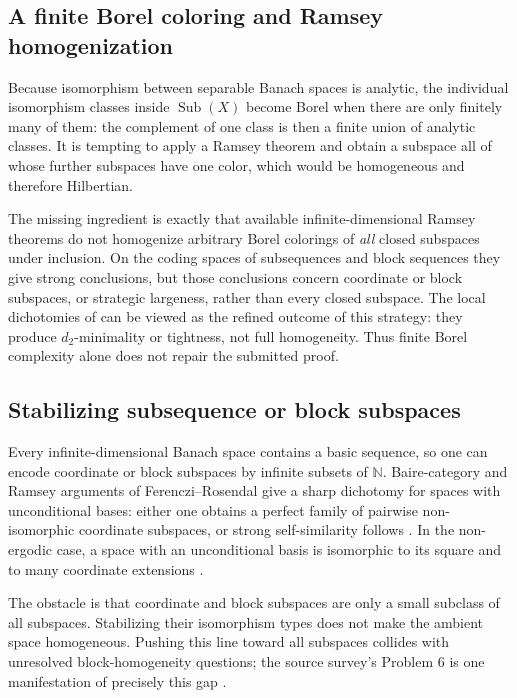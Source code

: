 \documentclass[11pt]{article}
\theoremstyle{definition}
\theoremstyle{remark}
\newcommand{\Sub}{\operatorname{Sub}}
\newcommand{\N}{\mathbb N}
\begin{document}
\subsection{A finite Borel coloring and Ramsey homogenization}

Because isomorphism between separable Banach spaces is analytic, the individual isomorphism classes inside \(\Sub(X)\) become Borel when there are only finitely many of them: the complement of one class is then a finite union of analytic classes.  It is tempting to apply a Ramsey theorem and obtain a subspace all of whose further subspaces have one color, which would be homogeneous and therefore Hilbertian.

The missing ingredient is exactly that available infinite-dimensional Ramsey theorems do not homogenize arbitrary Borel colorings of \emph{all} closed subspaces under inclusion.  On the coding spaces of subsequences and block sequences they give strong conclusions, but those conclusions concern coordinate or block subspaces, or strategic largeness, rather than every closed subspace.  The local dichotomies of \cite{CCRF2023} can be viewed as the refined outcome of this strategy: they produce \(d_2\)-minimality or tightness, not full homogeneity.  Thus finite Borel complexity alone does not repair the submitted proof.

\subsection{Stabilizing subsequence or block subspaces}

Every infinite-dimensional Banach space contains a basic sequence, so one can encode coordinate or block subspaces by infinite subsets of \(\N\).  Baire-category and Ramsey arguments of Ferenczi--Rosendal give a sharp dichotomy for spaces with unconditional bases: either one obtains a perfect family of pairwise non-isomorphic coordinate subspaces, or strong self-similarity follows \cite{FRnumber}.  In the non-ergodic case, a space with an unconditional basis is isomorphic to its square and to many coordinate extensions \cite{FRnumber,CCRF2023}.

The obstacle is that coordinate and block subspaces are only a small subclass of all subspaces.  Stabilizing their isomorphism types does not make the ambient space homogeneous.  Pushing this line toward all subspaces collides with unresolved block-homogeneity questions; the source survey's Problem 6 is one manifestation of precisely this gap \cite{DLT2010}.
\end{document}
